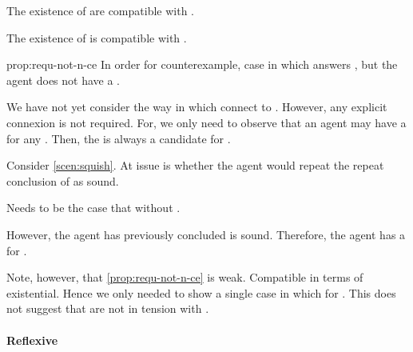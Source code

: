 \begin{note}
  The existence of  are compatible with \issueConstraint{}.
  \begin{proposition}
    \label{prop:requ-not-n-ce}
    The existence of  is compatible with \issueConstraint{}.
  \end{proposition}
  \begin{argument}{prop:requ-not-n-ce}
    In order for counterexample, case in which \ros{} answers \qWhyV{}, but the agent does not have a \wit{}.

    We have not yet consider the way in which  connect to \qWhyV{}.
    However, any explicit connexion is not required.
    For, we only need to observe that an agent may have a \wit{} for any \requ{}.
    Then, the \wit{} is always a candidate for \qHowV{}.

    Consider \autoref{scen:squish}.
    At issue is whether the agent would repeat the repeat conclusion of \sqE{} as sound.

    Needs to be the case that \ros{} without \wit{}.

    However, the agent has previously concluded \sqE{} is sound.
    Therefore, the agent has a \wit{} for \ros{}.
  \end{argument}

  Note, however, that \autoref{prop:requ-not-n-ce} is weak.
  Compatible in terms of existential.
  Hence we only needed to show a single case in which \wit{} for \requ{}.
  This does not suggest that  are not in tension with \issueConstraint{}.
\end{note}

\paragraph*{Reflexive }

